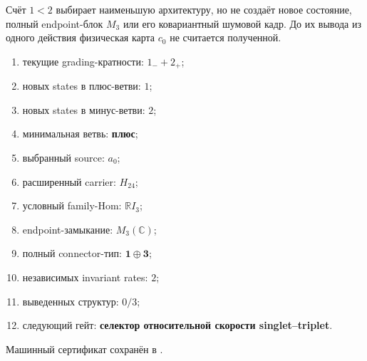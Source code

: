 \begin{nogocriterion}
Счёт $1<2$ выбирает наименьшую архитектуру, но не создаёт новое состояние,
полный endpoint-блок $M_3$ или его ковариантный шумовой кадр. До их вывода
из одного действия физическая карта $c_0$ не считается полученной.
\end{nogocriterion}

\begin{protocol}\begin{enumerate}
\item текущие grading-кратности: \textbf{$1_-+2_+$};
\item новых states в плюс-ветви: \textbf{$1$};
\item новых states в минус-ветви: \textbf{$2$};
\item минимальная ветвь: \textbf{плюс};
\item выбранный source: \textbf{$a_0$};
\item расширенный carrier: \textbf{$H_{24}$};
\item условный family-Hom: \textbf{$\mathbb RI_3$};
\item endpoint-замыкание: \textbf{$M_3(\mathbb C)$};
\item полный connector-тип: \textbf{$\mathbf1\oplus\mathbf3$};
\item независимых invariant rates: \textbf{$2$};
\item выведенных структур: \textbf{$0/3$};
\item следующий гейт: \textbf{селектор относительной скорости singlet--triplet}.
\end{enumerate}\end{protocol}

Машинный сертификат сохранён в
.